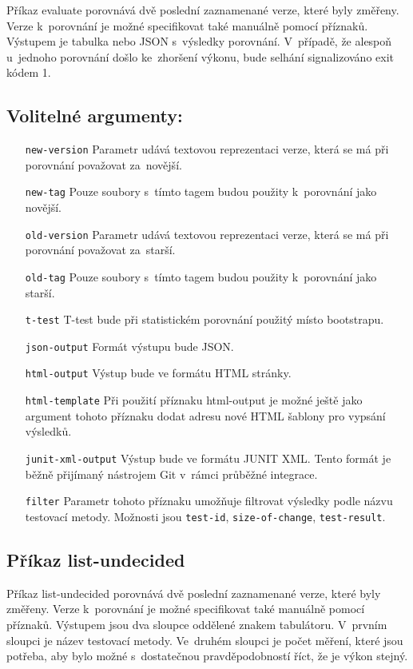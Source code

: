 Příkaz evaluate porovnává dvě poslední zaznamenané verze, které byly změřeny.
Verze k~porovnání je možné specifikovat také manuálně pomocí příznaků. Výstupem
je tabulka nebo JSON s~výsledky porovnání. V~případě, že alespoň u~jednoho porovnání
došlo ke~zhoršení výkonu, bude selhání signalizováno exit kódem 1.

\subsection*{Volitelné argumenty:}
\begin{itemize}[label=\texttt{\textbf{\textendash}}]
    \item[\texttt{new-version}] Parametr udává textovou reprezentaci verze, která se má při porovnání považovat za~novější.
    \item[\texttt{new-tag}]     Pouze soubory s~tímto tagem budou použity k~porovnání jako novější.
    \item[\texttt{old-version}] Parametr udává textovou reprezentaci verze, která se má při porovnání považovat za~starší.
    \item[\texttt{old-tag}]     Pouze soubory s~tímto tagem budou použity k~porovnání jako starší.
    \item[\texttt{t-test}]      T-test bude při statistickém porovnání použitý místo bootstrapu.
    \item[\texttt{json-output}] Formát výstupu bude JSON.
    \item[\texttt{html-output}] Výstup bude ve formátu HTML stránky.
    \item[\texttt{html-template}] Při použití příznaku html-output je možné ještě jako argument tohoto příznaku dodat adresu nové HTML šablony pro vypsání výsledků.
    \item[\texttt{junit-xml-output}] Výstup bude ve formátu JUNIT XML. Tento formát je běžně přijímaný nástrojem Git v~rámci průběžné integrace.
    \item[\texttt{filter}]      Parametr tohoto příznaku umožňuje filtrovat výsledky podle názvu testovací metody.
                                Možnosti jsou \texttt{test-id}, \texttt{size-of-change}, \texttt{test-result}.
\end{itemize}

\subsection{Příkaz list-undecided}

Příkaz list-undecided porovnává dvě poslední zaznamenané verze, které byly změřeny.
Verze k~porovnání je možné specifikovat také manuálně pomocí příznaků. Výstupem
jsou dva sloupce oddělené znakem tabulátoru. V~prvním sloupci je název testovací metody.
Ve~druhém sloupci je počet měření, které jsou potřeba, aby bylo možné s~dostatečnou
pravděpodobností říct, že je výkon stejný.

